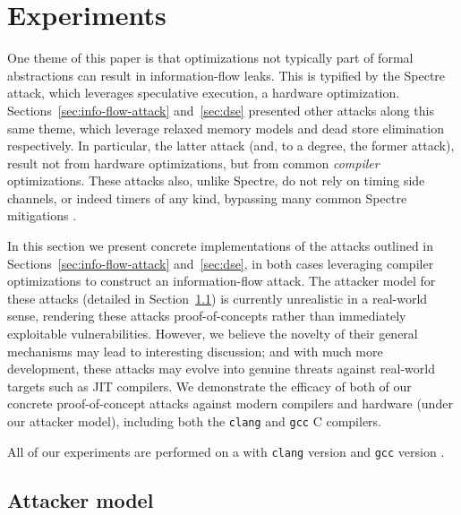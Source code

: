 \section{Experiments}
\label{sec:experiments}

One theme of this paper is that optimizations not typically part of formal
abstractions can result in information-flow leaks.
This is typified by the Spectre attack, which leverages speculative execution,
a hardware optimization.
Sections~\ref{sec:info-flow-attack} and~\ref{sec:dse} presented other attacks
along this same theme, which leverage relaxed memory models and dead store
elimination respectively.
In particular, the latter attack (and, to a degree, the former attack), result
not from hardware optimizations, but from common \emph{compiler} optimizations.
These attacks also, unlike Spectre, do not rely on timing side channels, or
indeed timers of any kind, bypassing many common Spectre mitigations
\cite{FuzzyFox, Chrome's and Firefox's restrictions on precise timers, etc}.

In this section we present concrete implementations of the attacks outlined in
Sections~\ref{sec:info-flow-attack} and~\ref{sec:dse}, in both cases
leveraging compiler optimizations to construct an information-flow attack.
The attacker model for these attacks (detailed in
Section~\ref{subsec:attacker-model}) is currently unrealistic in a
real-world sense, rendering these attacks proof-of-concepts rather than
immediately exploitable vulnerabilities.
However, we believe the novelty of their general mechanisms may lead to
interesting discussion; and with much more development, these attacks may
evolve into genuine threats against real-world targets such as JIT compilers.
We demonstrate the efficacy of both of our concrete proof-of-concept
attacks against modern compilers and hardware (under our attacker model),
including both the \verb|clang| and \verb|gcc| C compilers.

All of our experiments are performed on a  with
\verb|clang| version  and \verb|gcc| version .

\subsection{Attacker model}
\label{subsec:attacker-model}

